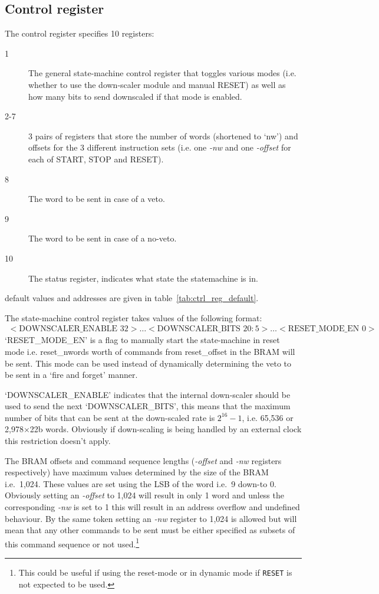     \subsection{Control register} %
    \label{sub:ctrl_reg}
    The control register specifies 10 registers:
    \begin{description}
        \item[1] The general state-machine control register that toggles various modes (i.e. whether to use the down-scaler module and manual RESET) as well as how many bits to send downscaled if that mode is enabled.
        \item[2-7] 3 pairs of registers that store the number of words (shortened to `nw') and offsets for the 3 different instruction sets (i.e. one \emph{-nw} and one \emph{-offset} for each of START, STOP and RESET).
        \item[8] The word to be sent in case of a veto.
        \item[9] The word to be sent in case of a no-veto.
        \item[10] The status register, indicates what state the statemachine is in.
    \end{description}
    default values and addresses are given in table~\ref{tab:ctrl_reg_default}.
    
    The state-machine control register takes values of the following format:
    \begin{align} \label{fmt:control_reg}
        <\text{DOWNSCALER\_ENABLE } 32>\ldots<\text{DOWNSCALER\_BITS } 20:5>\ldots<\text{RESET\_MODE\_EN } 0>
    \end{align}
    `RESET\_MODE\_EN' is a flag to manually start the state-machine in reset mode i.e. reset\_nwords worth of commands from reset\_offset in the BRAM will be sent. This mode can be used instead of dynamically determining the veto to be sent in a `fire and forget' manner.

    `DOWNSCALER\_ENABLE' indicates that the internal down-scaler should be used to send the next `DOWNSCALER\_BITS', this means that the maximum number of bits that can be sent at the down-scaled rate is \(2^{16} - 1\), i.e. 65,536 or 2,978\(\times\)22b words. Obviously if down-scaling is being handled by an external clock this restriction doesn't apply.

    The BRAM offsets and command sequence lengths (\emph{-offset} and \emph{-nw} registers respectively) have maximum values determined by the size of the BRAM i.e.\ 1,024. These values are set using the LSB of the word i.e.\ 9 down-to 0. Obviously setting an \emph{-offset} to 1,024 will result in only 1 word and unless the corresponding \emph{-nw} is set to 1 this will result in an address overflow and undefined behaviour. By the same token setting an \emph{-nw} register to 1,024 is allowed but will mean that any other commands to be sent must be either specified as subsets of this command sequence or not used.\footnote{This could be useful if using the reset-mode or in dynamic mode if \texttt{RESET} is not expected to be used.}
    
